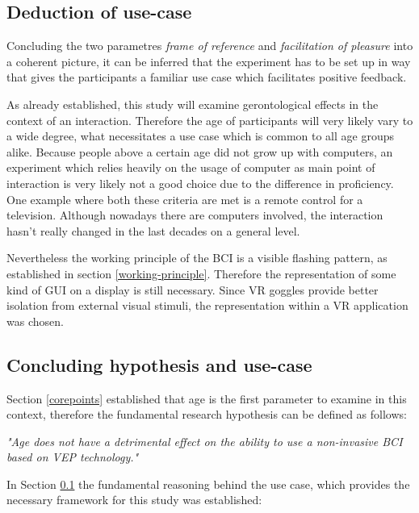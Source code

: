             \subsection{Deduction of use-case}\label{use-case}

                Concluding the two parametres \textit{frame of reference} and \textit{facilitation of pleasure} into a coherent picture, it can be inferred that the experiment has to be set up in way that gives the participants a familiar use case which facilitates positive feedback. 

                As already established, this study will examine gerontological effects in the context of an interaction. Therefore the age of participants will very likely vary to a wide degree, what necessitates a use case which is common to all age groups alike. Because people above a certain age did not grow up with computers, an experiment which relies heavily on the usage of computer as main point of interaction is very likely not a good choice due to the difference in proficiency. One example where both these criteria are met is a remote control for a television. Although nowadays there are computers involved, the interaction hasn't really changed in the last decades on a general level.

                Nevertheless the working principle of the BCI is a visible flashing pattern, as established in section \ref*{working-principle}. Therefore the representation of some kind of GUI on a display is still necessary. Since VR goggles provide better isolation from external visual stimuli, the representation within a VR application was chosen. 

                \medskip

            \subsection{Concluding hypothesis and use-case}\label{hypothesis}
            
                Section \ref*{corepoints} established that age is the first parameter to examine in this context, therefore the fundamental research hypothesis can be defined as follows:

                \medskip
                \emph{"Age does not have a detrimental effect on the ability to use a non-invasive BCI based on VEP technology."}
                \medskip

                In Section \ref*{use-case} the fundamental reasoning behind the use case, which provides the necessary framework for this study was established:

